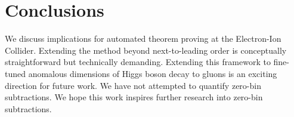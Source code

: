 \section{Conclusions}\label{sec:conclusions}

We discuss implications for automated theorem proving at the
Electron-Ion Collider. Extending the method beyond next-to-leading order
is conceptually straightforward but technically demanding. Extending
this framework to fine-tuned anomalous dimensions of Higgs boson decay
to gluons is an exciting direction for future work. We have not
attempted to quantify zero-bin subtractions. We hope this work inspires
further research into zero-bin subtractions.

